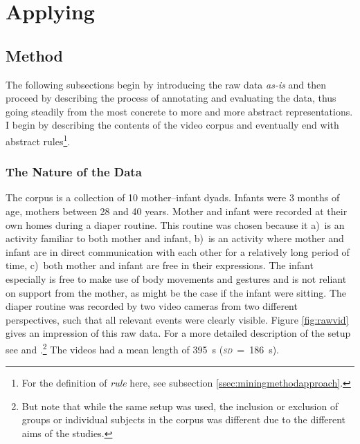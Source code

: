 
\chapter{Applying \fpmupper}
\label{ch:mining}

\section{Method}
\label{sec:miningmethod}
The following subsections begin by introducing the raw data \emph{as-is} and then proceed by describing the process of annotating and evaluating the data, thus going steadily from the most concrete to more and more abstract representations. I begin by describing the contents of the video corpus and eventually end with abstract rules\footnote{For the definition of \emph{rule} here, see subsection \ref{ssec:miningmethodapproach}.}.

\subsection{The Nature of the Data}
\label{ssec:miningmethodnature}
The corpus is a collection of 10 mother--infant dyads. Infants were 3 months of age, mothers between 28 and 40 years. Mother and infant were recorded at their own homes during a diaper routine. This routine was chosen because it a)~is an activity familiar to both mother and infant, b)~is an activity where mother and infant are in direct communication with each other for a relatively long period of time, c)~both mother and infant are free in their expressions. The infant especially is free to make use of body movements and gestures and is not reliant on support from the mother, as might be the case if the infant were sitting. The diaper routine was recorded by two video cameras from two different perspectives, such that all relevant events were clearly visible. Figure \ref{fig:rawvid} gives an impression of this raw data. For a more detailed description of the setup see \citet[]{nomikou17} and \citet[]{nomikou11}.\footnote{But note that while the same setup was used, the inclusion or exclusion of groups or individual subjects in the corpus was different due to the different aims of the studies.} The videos had a mean length of 395~s (\emph{\textsc{sd}}~=~186~s).



